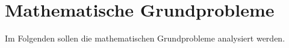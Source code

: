 \section{Mathematische Grundprobleme}\label{sec:mathematische-grundprobleme}

Im Folgenden sollen die mathematischen Grundprobleme analysiert werden.



